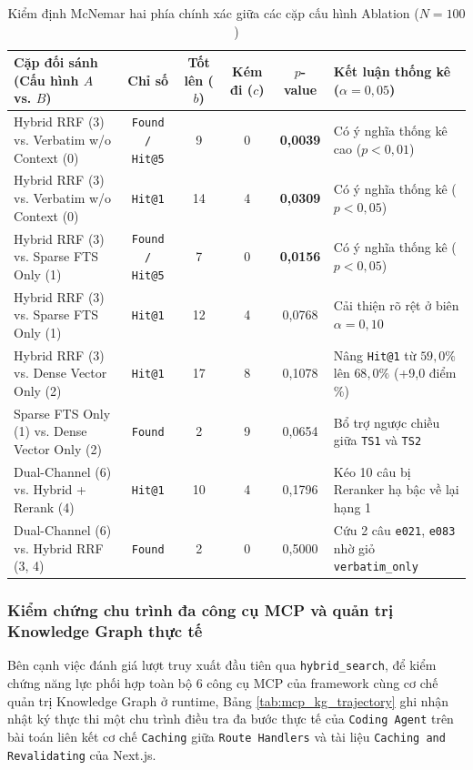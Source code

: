 \begin{table}[H]
\centering
\caption{Kiểm định McNemar hai phía chính xác giữa các cặp cấu hình Ablation ($N = 100$)}
\label{tab:mcnemar}
\scriptsize\setlength{\tabcolsep}{3pt}\begin{tabularx}{\textwidth}{lcccc>{\raggedright\arraybackslash}X}
\toprule
\textbf{Cặp đối sánh (Cấu hình $A$ vs. $B$)} & \textbf{Chỉ số} & \textbf{Tốt lên ($b$)} & \textbf{Kém đi ($c$)} & \textbf{$p$-value} & \textbf{Kết luận thống kê ($\alpha = 0,05$)} \\
\midrule
Hybrid RRF (3) vs. Verbatim w/o Context (0) & \texttt{Found / Hit@5} & 9 & 0 & \textbf{0,0039} & Có ý nghĩa thống kê cao ($p < 0,01$) \\
Hybrid RRF (3) vs. Verbatim w/o Context (0) & \texttt{Hit@1} & 14 & 4 & \textbf{0,0309} & Có ý nghĩa thống kê ($p < 0,05$) \\
Hybrid RRF (3) vs. Sparse FTS Only (1) & \texttt{Found / Hit@5} & 7 & 0 & \textbf{0,0156} & Có ý nghĩa thống kê ($p < 0,05$) \\
Hybrid RRF (3) vs. Sparse FTS Only (1) & \texttt{Hit@1} & 12 & 4 & 0,0768 & Cải thiện rõ rệt ở biên $\alpha = 0,10$ \\
Hybrid RRF (3) vs. Dense Vector Only (2) & \texttt{Hit@1} & 17 & 8 & 0,1078 & Nâng \texttt{Hit@1} từ $59,0\%$ lên $68,0\%$ (+9,0 điểm \%) \\
Sparse FTS Only (1) vs. Dense Vector Only (2) & \texttt{Found} & 2 & 9 & 0,0654 & Bổ trợ ngược chiều giữa \texttt{TS1} và \texttt{TS2} \\
Dual-Channel (6) vs. Hybrid + Rerank (4) & \texttt{Hit@1} & 10 & 4 & 0,1796 & Kéo 10 câu bị Reranker hạ bậc về lại hạng 1 \\
Dual-Channel (6) vs. Hybrid RRF (3, 4) & \texttt{Found} & 2 & 0 & 0,5000 & Cứu 2 câu \texttt{e021}, \texttt{e083} nhờ giỏ \texttt{verbatim\_only} \\
\bottomrule
\end{tabularx}
\end{table}

\subsubsection{Kiểm chứng chu trình đa công cụ MCP và quản trị Knowledge Graph thực tế}
Bên cạnh việc đánh giá lượt truy xuất đầu tiên qua \texttt{hybrid\_search}, để kiểm chứng năng lực phối hợp toàn bộ 6 công cụ MCP của framework cùng cơ chế quản trị Knowledge Graph ở runtime, Bảng \ref{tab:mcp_kg_trajectory} ghi nhận nhật ký thực thi một chu trình điều tra đa bước thực tế của \texttt{Coding Agent} trên bài toán liên kết cơ chế \texttt{Caching} giữa \texttt{Route Handlers} và tài liệu \texttt{Caching and Revalidating} của Next.js.

